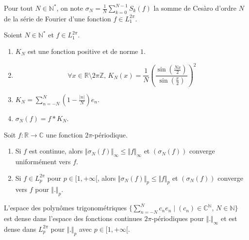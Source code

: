   \begin{notation}
    Pour tout $N \in \mathbb{N}^*$, on note $\sigma_N = \frac{1}{N} \sum_{k=0}^{N-1} S_k(f)$ la somme de Cesàro d'ordre $N$ de la série de Fourier d'une fonction $f \in L_1^{2 \pi}$.
  \end{notation}

  \begin{proposition}
    Soient $N \in \mathbb{N}^*$ et $f \in L_1^{2 \pi}$.
    \begin{enumerate}[label={\bfseries(\roman*)}]
      \item $K_N$ est une fonction positive et de norme $1$.
      \item \[ \forall x \in \mathbb{R} \setminus 2 \pi \mathbb{Z}, \, K_N(x) = \frac{1}{N} \left(\frac{\sin \left( \frac{Nx}{2} \right)}{\sin \left( \frac{x}{2} \right)}\right)^2 \]
      \item $K_N = \sum_{n=-N}^{N} \left(1 - \frac{\vert n \vert}{N}\right) e_n$.
      \item $\sigma_N(f) = f * K_N$.
    \end{enumerate}
  \end{proposition}


  \begin{theorem}
    Soit $f : \mathbb{R} \rightarrow \mathbb{C}$ une fonction $2\pi$-périodique.
    \begin{enumerate}[label={\bfseries(\roman*)}]
      \item Si $f$ est continue, alors $\Vert \sigma_N(f) \Vert_\infty \leq \Vert f \Vert_\infty$ et $(\sigma_N(f))$ converge uniformément vers $f$.
      \item Si $f \in L_p^{2\pi}$ pour $p \in [1,+\infty[$, alors $\Vert \sigma_N(f) \Vert_p \leq \Vert f \Vert_p$ et $(\sigma_N(f))$ converge vers $f$ pour $\Vert . \Vert_p$.
    \end{enumerate}
  \end{theorem}

  \begin{corollary}
    L'espace des polynômes trigonométriques $\{ \sum_{n=-N}^N c_n e_n \mid (c_n) \in \mathbb{C}^{\mathbb{N}}, \, N \in \mathbb{N} \}$ est dense dans l'espace des fonctions continues $2\pi$-périodiques pour $\Vert . \Vert_\infty$ et est dense dans $L_p^{2\pi}$ pour $\Vert . \Vert_p$ avec $p \in [1,+\infty[$.
  \end{corollary}

